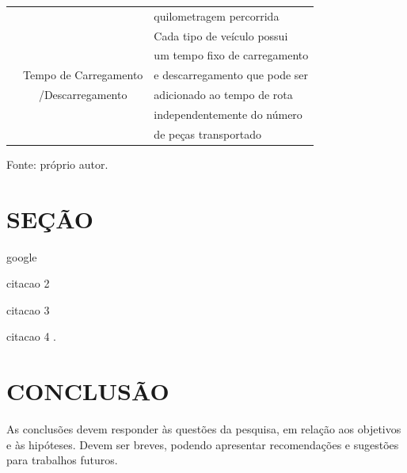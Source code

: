\documentclass[12pt, a4paper]{article}
\begin{document}
\begin{quadro}[H]
\begin{tabular}{|c|c|l|}
                                                &                                               & quilometragem percorrida              \\   \cline{2-3}
                                                &                                               & Cada tipo de veículo possui  \\
                                                &                                               & um tempo fixo de carregamento         \\
                                                & Tempo de Carregamento                         & e descarregamento que pode ser        \\
                                                & /Descarregamento                              & adicionado ao tempo de rota           \\
                                                &                                               & independentemente do número           \\
                                                &                                               & de peças transportado                 \\ 
                    \hline
                \end{tabular}
                \label{tab:restricoes}
                \par \footnotesize Fonte: próprio autor.
            \end{quadro}


    \section{SEÇÃO}
        
        \noindent google \cite{Mansini2014}

        \noindent citacao 2 \cite{Markowitz1952}

        \noindent citacao 3 \cite{Vukovic2020}

        \noindent citacao 4 .

    \section{CONCLUSÃO}

        \hspace{1.5cm} As conclusões devem responder às questões da pesquisa, em relação aos objetivos e às hipóteses. Devem ser breves, podendo apresentar recomendações e sugestões para trabalhos futuros.
\end{document}
